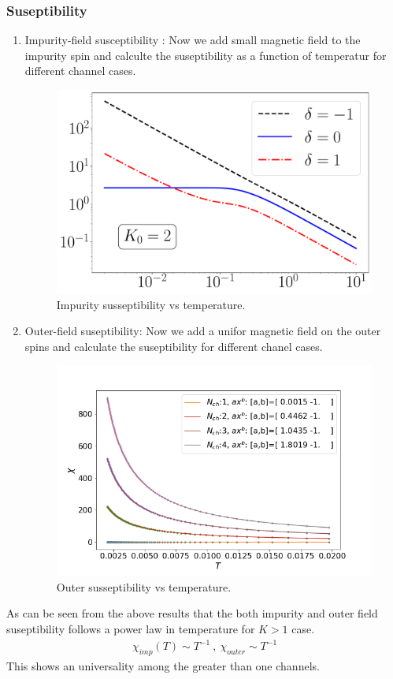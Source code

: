 \documentclass[reprint,prb,superscriptaddress]{revtex4-1}
\begin{document}
\subsubsection{Suseptibility}
\begin{enumerate}
\item Impurity-field susceptibility : Now we add small magnetic field to the impurity spin and calculte the suseptibility as a function of temperatur for different channel cases.
\begin{figure}
\centering
\includegraphics[scale=0.36]{plt/Central_Field_Chi_Powerlaw_}
\caption{Impurity susseptibility vs temperature.}
\label{fig:suseptibility_impurity}
\end{figure}

\item Outer-field suseptibility: Now we add a unifor magnetic field on the outer spins and calculate the suseptibility for different chanel cases.
\begin{figure}
\centering
\includegraphics[scale=0.36]{plt/Outer_Field_Chi_Powerlaw_}
\caption{Outer susseptibility vs temperature.}
\label{fig:suseptibility_outer}
\end{figure}
\end{enumerate}
As can be seen from the above results that the both impurity and outer field suseptibility follows a power law in temperature for $K>1$ case. 
\begin{eqnarray}
\chi_{imp}(T) \sim T^{-1} ~,~\chi_{outer} \sim T^{-1}
\end{eqnarray}
This shows an universality among the greater than one channels.
\end{document}
